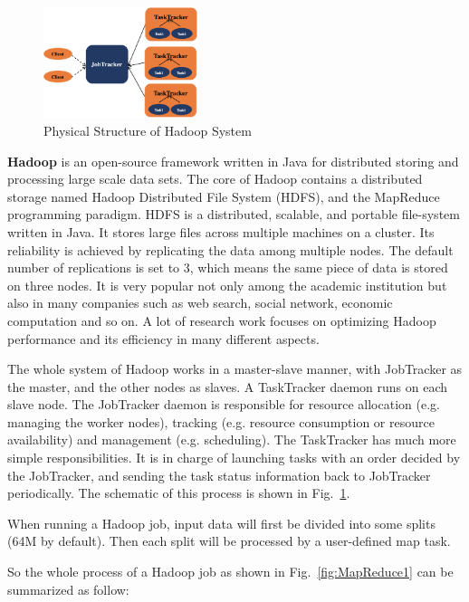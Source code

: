 \documentclass[	DIV=calc,%
							paper=a4,%
							fontsize=11pt,%
							twocolumn]{scrartcl}	 					%
\begin{document}
\begin{figure}
  \centering
    \includegraphics[width=0.4\textwidth]{images/mapreduce.png}
    \caption{Physical Structure of Hadoop System}
    \label{fig:MapReduce0}   
\end{figure}

\textbf{Hadoop} \cite{2} is an open-source framework written in Java for distributed storing and processing large scale data sets. The core of Hadoop contains a distributed storage named Hadoop Distributed File System (HDFS), and the MapReduce programming paradigm. HDFS is a distributed, scalable, and portable file-system written in Java. It stores large files across multiple machines on a cluster. Its reliability is achieved by replicating the data among multiple nodes. The default number of replications is set to 3, which means the same piece of data is stored on three nodes. 
It is very popular not only among the academic institution but also in many companies such as web search, social network, economic computation and so on. A lot of research work focuses on optimizing Hadoop performance and its efficiency in many different aspects.

The whole system of Hadoop works in a master-slave manner, with JobTracker as the master, and the other nodes as slaves. A TaskTracker daemon runs on each slave node. 
The JobTracker daemon is responsible for resource allocation (e.g. managing the worker nodes), tracking (e.g. resource consumption or resource availability) and management (e.g. scheduling). 
The TaskTracker has much more simple responsibilities. It is in charge of launching tasks with an order decided by the JobTracker, and sending the task status information back to JobTracker periodically. The schematic of this process is shown in Fig.~\ref{fig:MapReduce0}.



When running a Hadoop job, input data will first be divided into some splits (64M by default). Then each split will be processed by a user-defined map task. 

So the whole process of a Hadoop job as shown in Fig.~\ref{fig:MapReduce1} can be summarized as follow:
\end{document}
